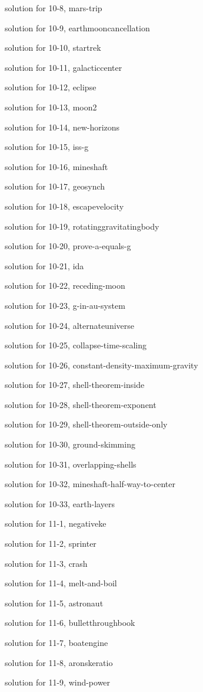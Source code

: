 \documentclass{problems}
\begin{document}
solution for 10-8, mars-trip

solution for 10-9, earthmooncancellation

solution for 10-10, startrek

solution for 10-11, galacticcenter

solution for 10-12, eclipse

solution for 10-13, moon2

solution for 10-14, new-horizons

solution for 10-15, iss-g

solution for 10-16, mineshaft

solution for 10-17, geosynch

solution for 10-18, escapevelocity

solution for 10-19, rotatinggravitatingbody

solution for 10-20, prove-a-equals-g

solution for 10-21, ida

solution for 10-22, receding-moon

solution for 10-23, g-in-au-system

solution for 10-24, alternateuniverse

solution for 10-25, collapse-time-scaling

solution for 10-26, constant-density-maximum-gravity

solution for 10-27, shell-theorem-inside

solution for 10-28, shell-theorem-exponent

solution for 10-29, shell-theorem-outside-only

solution for 10-30, ground-skimming

solution for 10-31, overlapping-shells

solution for 10-32, mineshaft-half-way-to-center

solution for 10-33, earth-layers

solution for 11-1, negativeke

solution for 11-2, sprinter

solution for 11-3, crash

solution for 11-4, melt-and-boil

solution for 11-5, astronaut

solution for 11-6, bulletthroughbook

solution for 11-7, boatengine

solution for 11-8, aronskeratio

solution for 11-9, wind-power
\end{document}
